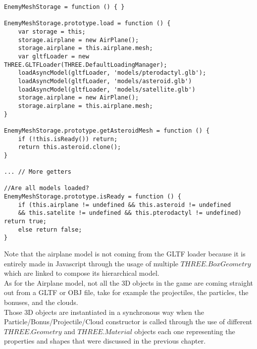 \documentclass[a4paper,11pt]{article}
\begin{document}
\begin{verbatim}
EnemyMeshStorage = function () { }

EnemyMeshStorage.prototype.load = function () {
    var storage = this;
    storage.airplane = new AirPlane();
    storage.airplane = this.airplane.mesh;
    var gltfLoader = new THREE.GLTFLoader(THREE.DefaultLoadingManager);
    loadAsyncModel(gltfLoader, 'models/pterodactyl.glb');
    loadAsyncModel(gltfLoader, 'models/asteroid.glb')
    loadAsyncModel(gltfLoader, 'models/satellite.glb')
    storage.airplane = new AirPlane();
    storage.airplane = this.airplane.mesh;
}

EnemyMeshStorage.prototype.getAsteroidMesh = function () {
    if (!this.isReady()) return;
    return this.asteroid.clone();
}

... // More getters

//Are all models loaded?
EnemyMeshStorage.prototype.isReady = function () {
    if (this.airplane != undefined && this.asteroid != undefined 
    && this.satelite != undefined && this.pterodactyl != undefined) return true;
    else return false;
}

\end{verbatim}
Note that the airplane model is not coming from the GLTF loader because it is entirely made in Javascript through the usage of multiple $THREE.BoxGeometry$ which are linked to compose its hierarchical model.\\
As for the Airplane model, not all the 3D objects in the game are coming straight out from a GLTF or OBJ file, take for example the projectiles, the particles, the bonuses, and the clouds.\\
Those 3D objects are instantiated in a synchronous way when the Particle/Bonus/Projectile/Cloud constructor is called through the use of different $THREE.Geometry$ and $THREE.Material$ objects each one representing the properties and shapes that were discussed in the previous chapter.\\
\end{document}
